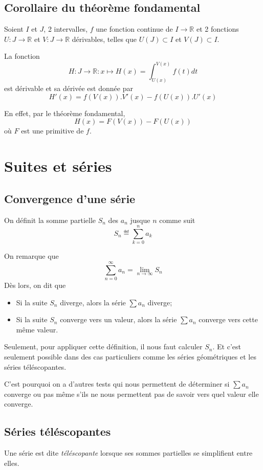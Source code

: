 \subsection{Corollaire du théorème fondamental}
Soient $I$ et $J$, 2 intervalles,
$f$ une fonction continue de $I \to \mathbb{R}$ et
2 fonctions $U : J \to \mathbb{R}$ et
$V : J \to \mathbb{R}$ dérivables,
telles que $U(J) \subset I$ et $V(J) \subset I$.

La fonction
\[ H : J \to \mathbb{R} :
x \mapsto H(x) = \int_{U(x)}^{V(x)} f(t) dt \]
est dérivable et sa dérivée est donnée par
\[ H'(x) = f(V(x)).V'(x) - f(U(x)).U'(x) \]

En effet, par le théorème fondamental,
\[ H(x) = F(V(x)) - F(U(x)) \]
où $F$ est une primitive de $f$.

\section{Suites et séries}
\subsection{Convergence d'une série}
On définit la somme partielle $S_n$ des $a_n$ jusque $n$ comme suit
\[ S_n \eqdef \sum_{k = 0}^n a_k \]

On remarque que
\[ \sum_{n = 0}^{\infty} a_n = \lim_{n \to \infty} S_n \]
Dès lors, on dit que
\begin{itemize}
  \item Si la suite $S_n$ diverge, alors la série $\sum a_n$ diverge;
  \item Si la suite $S_n$ converge vers un valeur,
    alors la série $\sum a_n$ converge vers cette même valeur.
\end{itemize}

Seulement, pour appliquer cette définition, il nous faut calculer $S_n$.
Et c'est seulement possible dans des cas particuliers comme les
séries géométriques et les séries téléscopantes.

C'est pourquoi on a d'autres tests qui nous permettent de déterminer si
$\sum a_n$ converge ou pas même s'ils ne nous permettent pas de savoir
vers quel valeur elle converge.

\subsection{Séries téléscopantes}
Une série est dite \emph{téléscopante} lorsque
ses sommes partielles se simplifient entre elles.

